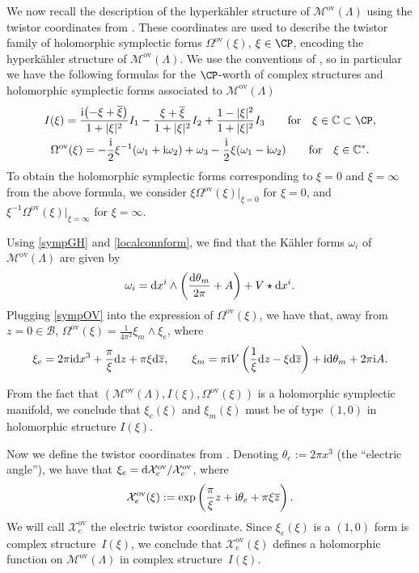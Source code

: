 We now recall the description of the hyperk\"ahler structure of $\mathcal{M}^{\text{ov}}(\Lambda)$ using the twistor coordinates from \cite{GMN1}. These coordinates are used to describe the twistor family of holomorphic symplectic forms $\Omega^{\text{ov}}(\xi)$, $\xi\in \CP$, encoding the hyperk\"ahler structure of $\mathcal{M}^{\text{ov}}(\Lambda)$. We use the conventions of \cite{GMN1}, so in particular we have the following formulas for the $\CP$-worth of complex structures and holomorphic symplectic forms associated to $\mathcal{M}^{\text{ov}}(\Lambda)$
\begin{gather*}
 I(\xi)=\frac{{\rm i}\bigl(-\xi +\overline{\xi}\bigr)}{1+|\xi|^2}I_1 - \frac{\xi + \overline{\xi}}{1+|\xi|^2}I_2 + \frac{1-|\xi|^2}{1+|\xi|^2}I_3 \qquad \text{for} \quad \xi \in \mathbb{C}\subset \CP,\\
 \Omega^{\text{ov}}(\xi)=-\frac{{\rm i}}{2}\xi^{-1}(\omega_1+{\rm i}\omega_2)+\omega_3-\frac{{\rm i}}{2}\xi(\omega_1-{\rm i}\omega_2) \qquad\text{for} \quad \xi \in \mathbb{C}^*.
\end{gather*}
To obtain the holomorphic symplectic forms corresponding to $\xi=0$ and $\xi=\infty$ from the above formula, we consider $\xi\Omega^{\text{ov}}(\xi)|_{\xi=0}$ for $\xi=0$, and $\xi^{-1}\Omega^{\text{ov}}(\xi)|_{\xi=\infty}$ for $\xi=\infty$.

Using \eqref{sympGH} and \eqref{localconnform}, we find that the K\"ahler forms $\omega_i$ of $\mathcal{M}^{\text{ov}}(\Lambda)$ are given by
\begin{equation}\label{sympOV}
 \omega_i = {\rm d}x^i\wedge \left(\frac{{\rm d}\theta_m}{2\pi} + A\right) + V\star {\rm d}x^i.
\end{equation}
Plugging \eqref{sympOV} into the expression of $\Omega^{\text{ov}}(\xi)$, we have that, away from $z=0\in \mathcal{B}$,
 $
 \Omega^{\text{ov}}(\xi)=\frac{1}{4\pi^2}\xi_m\wedge\xi_e$,
 where
 \begin{equation*}
 \xi_e=2\pi {\rm i}{\rm d}x^3 + \frac{\pi}{\xi}{\rm d}z+\pi\xi {\rm d}\overline{z},\qquad
 \xi_m=\pi {\rm i}V\left(\frac{1}{\xi}{\rm d}z-\xi {\rm d}\overline{z}\right)+ {\rm i}{\rm d}\theta_m +2\pi {\rm i}A.
 \end{equation*}


From the fact that $(\mathcal{M}^{\text{ov}}(\Lambda),I(\xi),\Omega^{\text{ov}}(\xi))$ is a holomorphic symplectic manifold, we conclude that $\xi_e(\xi)$ and $\xi_m(\xi)$ must be of type $(1,0)$ in holomorphic structure $I(\xi)$.

Now we define the twistor coordinates from \cite{GMN1}. Denoting $\theta_e:=2\pi x^3$ (the ``electric angle''), we have that $\xi_e={\rm d}\mathcal{X}_e^\text{ov} / \mathcal{X}_e^\text{ov}$, where
\begin{equation}\label{OV electric}
 \mathcal{X}_e^\text{ov}(\xi):=\exp \left(\frac{\pi}{\xi}z+{\rm i}\theta_e +\pi\xi \overline{z}\right).
\end{equation}
We will call $\mathcal{X}_e^\text{ov}$ the electric twistor coordinate. Since $\xi_e(\xi)$ is a $(1,0)$ form is complex structure~$I(\xi)$, we conclude that $\mathcal{X}_e^\text{ov}(\xi)$ defines a holomorphic function on $\mathcal{M}^{\text{ov}}(\Lambda)$ in complex structure~$I(\xi)$.

